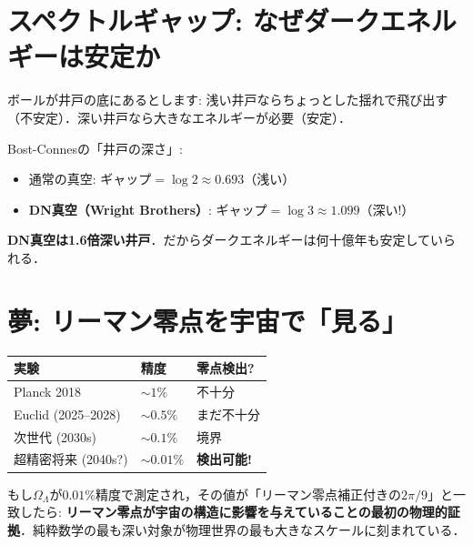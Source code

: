 \documentclass[11pt,a4paper]{article}
\begin{document}
\section{スペクトルギャップ: なぜダークエネルギーは安定か}
\begin{tcolorbox}[colback=blue!5,colframe=blue!50!black,title=アナロジー: 井戸の深さ]
ボールが井戸の底にあるとします: 浅い井戸ならちょっとした揺れで飛び出す（不安定）．深い井戸なら大きなエネルギーが必要（安定）．
\end{tcolorbox}
Bost-Connesの「井戸の深さ」:
\begin{itemize}
\item 通常の真空: ギャップ$= \log 2 \approx 0.693$（浅い）
\item \textbf{DN真空（Wright Brothers）}: ギャップ$= \log 3 \approx 1.099$（深い!）
\end{itemize}
\textbf{DN真空は1.6倍深い井戸}．だからダークエネルギーは何十億年も安定していられる．

\section{夢: リーマン零点を宇宙で「見る」}
\begin{center}
\begin{tabular}{lll}
\toprule 実験 & 精度 & 零点検出? \\ \midrule
Planck 2018 & $\sim 1\%$ & 不十分 \\
Euclid (2025--2028) & $\sim 0.5\%$ & まだ不十分 \\
次世代 (2030s) & $\sim 0.1\%$ & 境界 \\
超精密将来 (2040s?) & $\sim 0.01\%$ & \textbf{検出可能!} \\
\bottomrule
\end{tabular}
\end{center}
\begin{tcolorbox}[colback=yellow!10,colframe=orange!60!black]
もし$\Omega_\Lambda$が$0.01\%$精度で測定され，その値が「リーマン零点補正付きの$2\pi/9$」と一致したら: \textbf{リーマン零点が宇宙の構造に影響を与えていることの最初の物理的証拠}．純粋数学の最も深い対象が物理世界の最も大きなスケールに刻まれている．
\end{tcolorbox}
\end{document}
